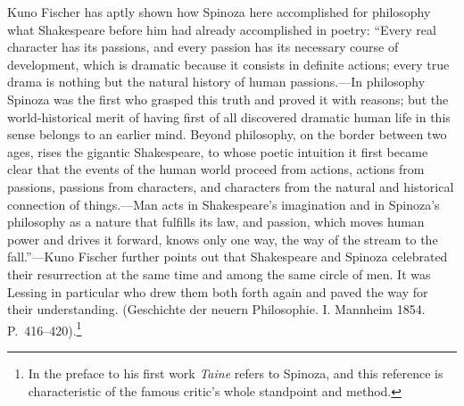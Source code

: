 \documentclass[12pt]{book}
\newcommand{\opage}[1]{\marginnote{\footnotesize\textit{[#1]}}}
\begin{document}
Kuno Fischer has aptly shown how Spinoza here accomplished for philosophy what
Shakespeare before him had already accomplished in poetry: ``Every real character has
its passions, and every passion has its necessary course of development, which is
dramatic because it consists in definite actions; every true drama is nothing but the
natural history of human passions.---In philosophy Spinoza was the first who grasped
this truth and proved it with reasons; but the world-historical merit of having first of
all discovered dramatic human life in this sense belongs to an earlier mind. Beyond
philosophy, on the border between two ages, rises the gigantic Shakespeare, to whose
poetic intuition it first became clear that the events of the human world proceed from
actions, actions from passions, passions from characters, and characters from the
natural and \opage{124}historical connection of things.---Man acts in Shakespeare's
imagination and in Spinoza's philosophy as a nature that fulfills its law, and passion,
which moves human power and drives it forward, knows only one way, the way of the stream
to the fall.''---Kuno Fischer further points out that Shakespeare and Spinoza celebrated
their resurrection at the same time and among the same circle of men. It was Lessing in
particular who drew them both forth again and paved the way for their understanding.
(Geschichte der neuern Philosophie. I. Mannheim 1854. P.~416--420).\footnote{In the
preface to his first work \emph{Taine} refers to Spinoza, and this reference is
characteristic of the famous critic's whole standpoint and method.}
\end{document}
